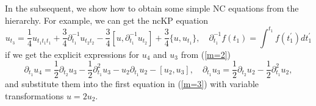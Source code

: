 \documentclass[11p,reqno]{amsart}
\numberwithin{equation}{section}
\numberwithin{equation}{section}
\begin{document}
In the subsequent, we show how to obtain some simple NC equations from the hierarchy. 
For example, we can get the ncKP equation \cite{gilson07,hamanaka03,hamanaka10,paniak01,sakakibara04}
\begin{equation} \label{ncKP}
    u_{t_3} = \frac{1}{4} u_{t_1t_1t_1} + \frac{3}{4} \partial_{t_1}^{-1} u_{t_2t_2} - \frac{3}{4} \left[u, \partial_{t_1}^{-1} u_{t_2}\right] + \frac{3}{4} \{u, u_{t_1}\},\quad \partial_{t_1}^{-1} f(t_1) = \int^{t_1} f(t_1^\prime) dt_1^\prime
\end{equation}
if we get the explicit expressions for  $u_4$ and $u_3$ from (\ref{m=2})
\begin{equation} \label{u_3}
    \partial_{t_1} u_4 = \frac{1}{2} \partial_{t_2} u_3 - \frac{1}{2} \partial_{t_1}^2 u_3 - u_2 \partial_{t_1} u_2 - \left[u_2, u_3\right], \quad \partial_{t_1} u_3 = \frac{1}{2} \partial_{t_2} u_2 - \frac{1}{2} \partial_{t_1}^2 u_2,
\end{equation}
and substitute them into the first equation in (\ref{m=3}) with variable transformations $u = 2 u_2$.


\end{document}
